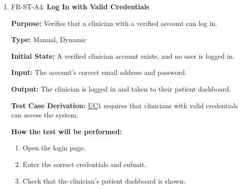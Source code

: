 \documentclass[12pt, titlepage]{article}
\newcommand{\srsuc}[1]{\href{https://github.com/Nour-Fawaz/MacaBoca/blob/main/pdfs/SRS/SRS.pdf}{UC}}
\renewcommand{\_}{\oldunderscore\allowbreak}
\begin{document}
\begin{enumerate}
  \item FR-ST-A4: \textbf{Log In with Valid Credentials\\}
  \begin{mdframed}[linewidth=0.5mm]
      \textbf{Purpose:} Verifies that a clinician with a verified account can log in. \par
      \textbf{Type:} Manual, Dynamic \par
      \textbf{Initial State:} A verified clinician account exists, and no user is logged in. \par
      \textbf{Input:} The account's correct email address and password. \par
      \textbf{Output:} The clinician is logged in and taken to their patient dashboard. \par
      \textbf{Test Case Derivation:} \srsuc*{1} requires that clinicians with valid credentials can access the system. \par
      \textbf{How the test will be performed:}
      \begin{enumerate}
          \item[1.] Open the login page.
          \item[2.] Enter the correct credentials and submit.
          \item[3.] Check that the clinician's patient dashboard is shown.
      \end{enumerate}
  \end{mdframed}


\end{enumerate}
\end{document}
